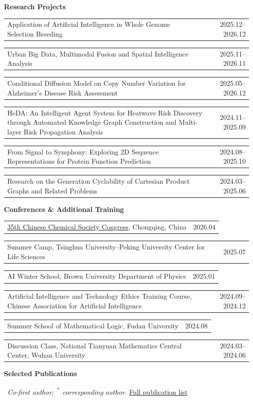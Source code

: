 \documentclass[11pt,a4paper]{article}
\makeatletter
\newcommand{\cvsection}[1]{%
  \par\addvspace{9pt}\Needspace{46pt}%
  {\centering\bfseries\fontsize{12}{14.5}\selectfont #1\par}%
  \nobreak\vspace{5pt}}
\newcommand{\cofirst}{\textsuperscript{\textdagger}}
\newcommand{\corr}{\textsuperscript{*}}
\newlength{\datedlinegap}
\newcommand{\datedline}[2]{%
  \Needspace{28pt}%
  \begin{tabularx}{\linewidth}{@{}>{\raggedright\arraybackslash}X@{\hspace{14pt}}r@{}}#1 & #2\end{tabularx}\par\vspace{\datedlinegap}}
\makeatother
\begin{document}
\cvsection{Research Projects}
\datedline{Application of Artificial Intelligence in Whole Genome Selection Breeding}{2025.12--2026.12}
\datedline{Urban Big Data, Multimodal Fusion and Spatial Intelligence Analysis}{2025.11--2026.11}
\datedline{Conditional Diffusion Model on Copy Number Variation for Alzheimer's Disease Risk Assessment}{2025.05--2026.12}
\datedline{HeDA: An Intelligent Agent System for Heatwave Risk Discovery through Automated Knowledge Graph Construction and Multi-layer Risk Propagation Analysis}{2024.11--2025.09}
\datedline{From Signal to Symphony: Exploring 2D Sequence Representations for Protein Function Prediction}{2024.08--2025.10}
\datedline{Research on the Generation Cyclability of Cartesian Product Graphs and Related Problems}{2024.03--2025.06}

\cvsection{Conferences \& Additional Training}
\datedline{\href{https://www.chemsoc.org.cn/meeting/35th/}{35th Chinese Chemical Society Congress}, Chongqing, China}{2026.04}
\datedline{Summer Camp, Tsinghua University--Peking University Center for Life Sciences}{2025.07}
\datedline{AI Winter School, Brown University Department of Physics}{2025.01}
\datedline{Artificial Intelligence and Technology Ethics Training Course, Chinese Association for Artificial Intelligence}{2024.09--2024.12}
\datedline{Summer School of Mathematical Logic, Fudan University}{2024.08}
\datedline{Discussion Class, National Tianyuan Mathematics Central Center, Wuhan University}{2024.03--2024.06}

\newpage
\cvsection{Selected Publications}
\textit{\cofirst\ Co-first author; \corr\ corresponding author.}
\hfill\href{https://wyqmath.cn/publications.html}{Full publication list}
\end{document}
